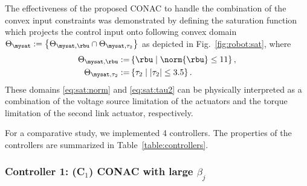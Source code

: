 \documentclass[lettersize,journal]{IEEEtran}
\begin{document}
The effectiveness of the proposed CONAC to handle the combination of the convex input constraints was demonstrated by defining the saturation function which projects the control input onto following convex domain $\Theta_{\mysat}:=\left\{\Theta_{\mysat, {\rbu}}\cap\Theta_{\mysat, {\tau_2}}\right\}$ as depicted in Fig.~\ref{fig:robot:sat}, where
\begin{subequations}
    \begin{align}
        \Theta_{\mysat, {\rbu}}
        :=&
        \left\{
            \rbu
            \mid
            \norm{\rbu} \le 
            11
        \right\}
        \label{eq:sat:norm}
        ,
        \\
        \Theta_{\mysat, {\tau_2}}
        :=&
        \left\{
            \tau_2
            \mid
            \vert{\tau_2}\vert \le 
            3.5
        \right\}
        .
        \label{eq:sat:tau2}
    \end{align}
    \label{eq:sat}%
\end{subequations}
These domains \eqref{eq:sat:norm} and \eqref{eq:sat:tau2} can be physically interpreted as a combination of the voltage source limitation of the actuators and the torque limitation of the second link actuator, respectively.

\hfill

For a comparative study, we implemented 4 controllers.
The properties of the controllers are summarized in Table~\ref{table:controllers}.

\subsubsection*{Controller 1: (C$_1$) CONAC with large $\beta_j$}
\end{document}
